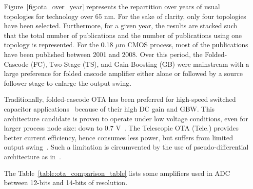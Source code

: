 Figure~\ref{fig:ota_over_year} represents the repartition over years of usual topologies for technology over 65 nm. For the sake of clarity, only four topologies have been selected. Furthermore, for a given year, the results are stacked such that the total number of publications and the number of publications using one topology is represented.
For the 0.18 \(\mu \)m CMOS process, most of the publications have been published between 2001 and 2008. Over this period, the Folded-Cascode (FC), Two-Stage (TS), and Gain-Boosting (GB) were mainstream with a large preference for folded cascode amplifier either alone or followed by a source follower stage to enlarge the output swing.

Traditionally, folded-cascode OTA has been preferred for high-speed switched capacitor applications~\cite{Olivera1999, Adut2003} because of their high DC gain and GBW\@. This architecture candidate is proven to operate under low voltage conditions, even for larger process node size: down to 0.7 V~\cite{Sauerbrey2002, Ahn2005}.
The Telescopic OTA (Tele.) provides better current efficiency, hence consumes less power, but suffers from limited output swing~\cite{Quinn2000}. Such a limitation is circumvented by the use of pseudo-differential architecture as in~\cite{Chiu2004}.

The Table~\ref{table:ota_comparison_table} lists some amplifiers used in ADC between 12-bits and 14-bits of resolution.

